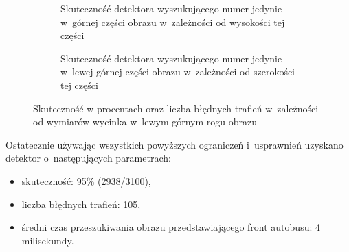 \begin{figure}[h!]\centering
	\begin{subfigure}{.49\linewidth}\centering
		\caption{Skuteczność detektora wyszukującego numer jedynie w~górnej części
			obrazu w~zależności od wysokości tej części}
		\label{chart:verticalCut2ratio}
	\end{subfigure}	
	\hfill
	\begin{subfigure}{.49\linewidth}\centering
		\caption{Skuteczność detektora wyszukującego numer jedynie w~lewej-górnej części
			obrazu w~zależności od szerokości tej części}
		\label{chart:horizontalCut2ratio}
	\end{subfigure}
	\caption{Skuteczność w procentach oraz liczba błędnych trafień 
		w~zależności od wymiarów wycinka w~lewym górnym rogu obrazu}
\end{figure}

Ostatecznie używając wszystkich powyższych ograniczeń i~usprawnień uzyskano detektor
o~następujących parametrach:
\begin{itemize}
	\item skuteczność: 95\% (2938/3100),
	\item liczba błędnych trafień: 105,
	\item średni czas przeszukiwania obrazu przedstawiającego front autobusu: 4 milisekundy.
\end{itemize}


